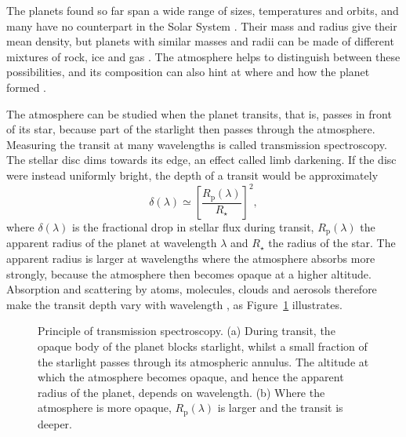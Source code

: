 The planets found so far span a wide range of sizes, temperatures and orbits, and many have no
counterpart in the Solar System \citep{WinnFabrycky2015}. Their mass and
radius give their mean density, but planets with similar masses and radii can
be made of different mixtures of rock, ice and gas \citep{RogersSeager2010}.
The atmosphere helps to distinguish between these possibilities, and its composition can also hint at where and how the planet formed \citep{Madhusudhan2019}.

The atmosphere can be studied when the planet transits, that is, passes in front of its star, because part of the starlight then passes through the atmosphere. Measuring the transit at many wavelengths is called
transmission spectroscopy. The stellar disc dims towards its edge, an effect called limb darkening. If the disc were instead uniformly bright, the depth of a transit would be approximately
\begin{equation}
  \delta(\lambda) \simeq
  \left[\frac{R_{\mathrm p}(\lambda)}{R_\star}\right]^2 ,
  \label{eq:transit-depth}
\end{equation}
where $\delta(\lambda)$ is the fractional drop in stellar flux during transit,
$R_{\mathrm p}(\lambda)$ the apparent radius of the planet at wavelength
$\lambda$ and $R_\star$ the radius of the star. The apparent radius is larger
at wavelengths where the atmosphere absorbs more strongly, because the
atmosphere then becomes opaque at a higher altitude. Absorption and scattering by atoms, molecules, clouds and aerosols therefore make the transit depth vary with
wavelength \citep{SeagerSasselov2000,Brown2001}, as
Figure~\ref{fig:transmission-spectroscopy} illustrates.

\begin{figure}[t]
  \centering
  
  \caption{Principle of transmission spectroscopy. (a) During transit, the
  opaque body of the planet blocks starlight, whilst a small fraction of the
  starlight passes through its atmospheric annulus. The altitude at which
  the atmosphere becomes opaque, and hence the apparent radius of the
  planet, depends on wavelength. (b) Where the atmosphere is more opaque,
  $R_{\mathrm p}(\lambda)$ is larger and the transit is deeper.}
  \label{fig:transmission-spectroscopy}
\end{figure}

